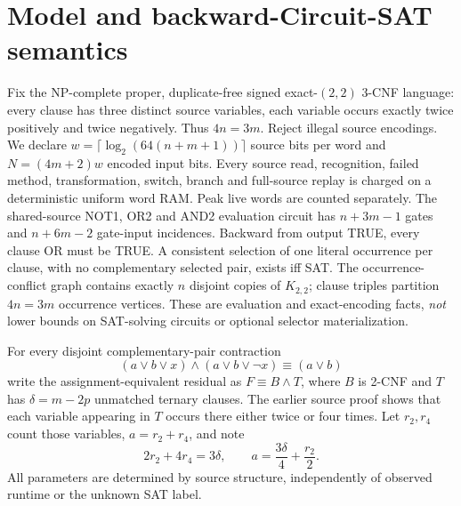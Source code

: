 \documentclass[11pt]{article}
\begin{document}
\section{Model and backward-Circuit-SAT semantics}
Fix the NP-complete proper, duplicate-free signed exact-$(2,2)$ 3-CNF language: every clause has three distinct source variables, each variable occurs exactly twice positively and twice negatively. Thus $4n=3m$. Reject illegal source encodings. We declare $w=\lceil\log_2(64(n+m+1))\rceil$ source bits per word and $N=(4m+2)w$ encoded input bits. Every source read, recognition, failed method, transformation, switch, branch and full-source replay is charged on a deterministic uniform word RAM. Peak live words are counted separately.
The shared-source NOT1, OR2 and AND2 evaluation circuit has $n+3m-1$ gates and $n+6m-2$ gate-input incidences. Backward from output TRUE, every clause OR must be TRUE. A consistent selection of one literal occurrence per clause, with no complementary selected pair, exists iff SAT. The occurrence-conflict graph contains exactly $n$ disjoint copies of $K_{2,2}$; clause triples partition $4n=3m$ occurrence vertices. These are evaluation and exact-encoding facts, \emph{not} lower bounds on SAT-solving circuits or optional selector materialization.

For every disjoint complementary-pair contraction
\[
(a\vee b\vee x)\wedge(a\vee b\vee\neg x)\equiv(a\vee b)
\]
write the assignment-equivalent residual as $F\equiv B\wedge T$, where $B$ is 2-CNF and $T$ has $\delta=m-2p$ unmatched ternary clauses. The earlier source proof shows that each variable appearing in $T$ occurs there either twice or four times. Let $r_2,r_4$ count those variables, $a=r_2+r_4$, and note
\[
2r_2+4r_4=3\delta,\qquad
a=\frac{3\delta}{4}+\frac{r_2}{2}.
\]
All parameters are determined by source structure, independently of observed runtime or the unknown SAT label.
\end{document}
